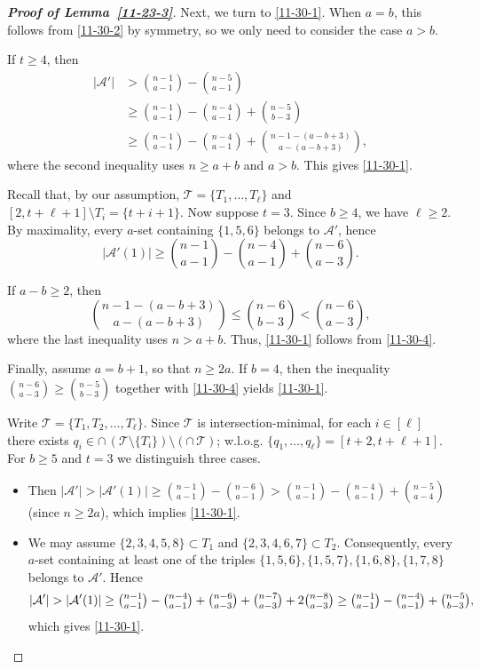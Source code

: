 \documentclass[11pt]{article}
\newcommand{\m}{\mathcal}
\begin{document}
\begin{proof}[{\bf Proof of Lemma~\ref{11-23-3}}]
Next, we turn to \eqref{11-30-1}. When $a=b$, this follows from \eqref{11-30-2} by symmetry, so we only need to consider the case $a>b$. 

If $t\ge 4$, then 
\begin{align*}
|\mathcal{A}'|
&>{n-1\choose a-1}-{n-5\choose a-1}\\
&\ge {n-1\choose a-1}-{n-4\choose a-1}+{n-5\choose b-3}\\
&\ge {n-1\choose a-1}-{n-4\choose a-1}+{n-1-(a-b+3)\choose a-(a-b+3)},
\end{align*}
where the second inequality uses $n\ge a+b$  and $a>b$.
This  gives \eqref{11-30-1}.


Recall that, by our assumption, $\m T = \{T_1,\ldots, T_\ell\}$ and $[2,t+\ell+1]\setminus T_i=\{t+i+1\}$. Now suppose $t=3$. 
Since $b\ge 4$, we have $\ell\ge 2.$
By maximality, every $a$-set containing $\{1,5,6\}$ belongs to $\mathcal{A}'$,
hence
\begin{equation}\label{11-30-4}
|\mathcal{A}'(1)|\ge {n-1\choose a-1}-{n-4\choose a-1}+{n-6\choose a-3}.
\end{equation}

If $a-b\ge 2$, then 
\[
{n-1-(a-b+3)\choose a-(a-b+3)}\le {n-6\choose b-3}< {n-6\choose a-3},
\]
where the last inequality uses $n>a+b$. Thus, \eqref{11-30-1} follows from \eqref{11-30-4}.

Finally, assume $a=b+1$, so that $n\ge 2a$. 
If $b=4$, then the inequality
${n-6\choose a-3}\ge {n-5\choose b-3}$ together with \eqref{11-30-4} yields \eqref{11-30-1}. 

Write $\m T=\{T_1, T_2, \dots, T_{\ell}\}$. Since $\mathcal{T}$ is intersection-minimal, for each $i\in [\ell]$ there exists $q_i\in \cap\,(\mathcal{T}\setminus \{T_i\})\setminus (\cap \,\mathcal{T})$;
w.l.o.g. $\{q_1, \dots, q_{\ell}\}=[t+2, t+\ell+1]$. 
For $b\ge 5$ and $t=3$ we distinguish three cases.
\begin{itemize}
\item[($\ell=1$).] 
Then $|\mathcal{A}'| > |\mathcal{A}'(1)| 
   \ge \binom{n-1}{a-1} - \binom{n-6}{a-1}
   > \binom{n-1}{a-1} - \binom{n-4}{a-1} + \binom{n-5}{a-4}$ (since $n\ge 2a$),
   which implies \eqref{11-30-1}.

\item[($\ell=2$).] 
We may assume $\{2,3,4,5,8\}\subset T_1$ and $\{2,3,4,6,7\}\subset T_2$.
Consequently, every $a$-set containing at least one of the triples
$\{1,5,6\},\{1,5,7\},\{1,6,8\},\{1,7,8\}$ belongs to $\mathcal{A}'$. 
Hence
$$|\mathcal{A}'| 
   > |\mathcal{A}'(1)| \ge \tbinom{n-1}{a-1} - \tbinom{n-4}{a-1} 
        + \tbinom{n-6}{a-3} + \tbinom{n-7}{a-3} + 2\tbinom{n-8}{a-3} 
   \ge \tbinom{n-1}{a-1} - \tbinom{n-4}{a-1} + \tbinom{n-5}{b-3},
$$
which gives \eqref{11-30-1}.


\end{itemize}
\end{proof}
\end{document}

